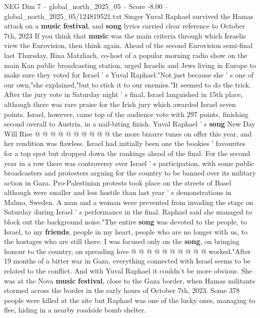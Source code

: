 \begin{textsample}{NEG Dim 7 – global\_north\_2025\_05 – Score -8.00 – global\_north\_2025\_05/124819521.txt}  \label{ex:f7_neg_108}
Singer Yuval Raphael survived the Hamas attack on a \textbf{music} \textbf{festival}, and \textbf{song} lyrics carried clear reference to October 7th, 2023 If you think that \textbf{music} was the main criteria through which Israelis view the Eurovision, then think again.
Ahead of the second Eurovision semi-final last Thursday, Rina Matzliach, co-host of a popular morning radio show on the main Kan public broadcasting station, urged Israelis and Jews living in Europe to make sure they voted for Israel ' s Yuval Raphael."Not just because she ' s one of our own,"she explained,"but to stick it to our enemies."It seemed to do the trick.
After the jury vote in Saturday night ' s final, Israel languished in 15th place, although there was rare praise for the Irish jury which awarded Israel seven points.
Israel, however, came top of the audience vote with 297 points, finishing second overall to Austria, in a nail-biting finish.
Yuval Raphael ' s \textbf{song} New Day Will Rise @ @ @ @ @ @ @ @ @ @ the more bizarre tunes on offer this year, and her rendition was flawless.
Israel had initially been one the bookies ' favourites for a top spot but dropped down the rankings ahead of the final.
For the second year in a row there was controversy over Israel ' s participation, with some public broadcasters and protesters arguing for the country to be banned over its military action in Gaza.
Pro-Palestinian protests took place on the streets of Basel although were smaller and less hostile than last year ' s demonstrations in Malmo, Sweden.
A man and a woman were prevented from invading the stage on Saturday during Israel ' s performance in the final.
Raphael said she managed to block out the background noise."The entire \textbf{song} was devoted to the people, to Israel, to my \textbf{friends}, people in my heart, people who are no longer with us, to the hostages who are still there.
I was focused only on the \textbf{song}, on bringing honour to the country, on spreading love @ @ @ @ @ @ @ @ @ @ worked."After 19 months of a bitter war in Gaza, everything connected with Israel seems to be related to the conflict.
And with Yuval Raphael it couldn't be more obvious.
She was at the Nova \textbf{music} \textbf{festival}, close to the Gaza border, when Hamas militants stormed across the border in the early hours of October 7th, 2023.
Some 378 people were killed at the site but Raphael was one of the lucky ones, managing to flee, hiding in a nearby roadside bomb shelter.

\end{textsample}
